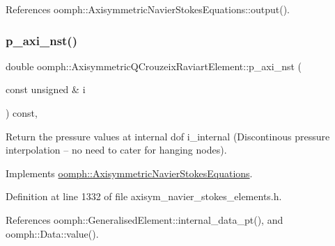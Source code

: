 References oomph\+::\+Axisymmetric\+Navier\+Stokes\+Equations\+::output().

\mbox{\label{classoomph_1_1AxisymmetricQCrouzeixRaviartElement_acaa357820f2efb863d442b66e9761c6d}} 
\subsubsection{\texorpdfstring{p\+\_\+axi\+\_\+nst()}{p\_axi\_nst()}}
{\footnotesize\ttfamily double oomph\+::\+Axisymmetric\+Q\+Crouzeix\+Raviart\+Element\+::p\+\_\+axi\+\_\+nst (\begin{DoxyParamCaption}\item[{const unsigned \&}]{i }\end{DoxyParamCaption}) const\hspace{0.3cm}{\ttfamily [inline]}, {\ttfamily [virtual]}}



Return the pressure values at internal dof i\+\_\+internal (Discontinous pressure interpolation -- no need to cater for hanging nodes). 



Implements \hyperlink{classoomph_1_1AxisymmetricNavierStokesEquations_a3aa173227f477a40fb4adba84a337f5b}{oomph\+::\+Axisymmetric\+Navier\+Stokes\+Equations}.



Definition at line 1332 of file axisym\+\_\+navier\+\_\+stokes\+\_\+elements.\+h.



References oomph\+::\+Generalised\+Element\+::internal\+\_\+data\+\_\+pt(), and oomph\+::\+Data\+::value().

\mbox{\label{classoomph_1_1AxisymmetricQCrouzeixRaviartElement_adc569122e3649deba56231175f3116cf}} 

